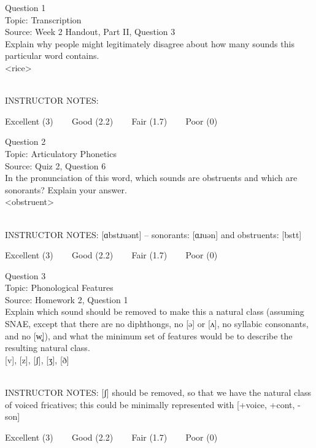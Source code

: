 \documentclass[12pt]{article}
\begin{document}
{\large Question 1}\\

Topic: Transcription\\
Source: Week 2 Handout, Part II, Question 3\\

Explain why people might legitimately disagree about how many sounds this particular word contains.\\

<rice>


~\\
INSTRUCTOR NOTES: 


\vfill
Excellent (3) ~~~ Good (2.2) ~~~ Fair (1.7) ~~~ Poor (0)
\newpage

{\large Question 2}\\

Topic: Articulatory Phonetics\\
Source: Quiz 2, Question 6\\

In the pronunciation of this word, which sounds are obstruents and which are sonorants? Explain your answer.\\

<obstruent>


~\\
INSTRUCTOR NOTES: [ɑbstɹuənt] -- sonorants: [ɑɹuən] and obstruents: [bstt]


\vfill
Excellent (3) ~~~ Good (2.2) ~~~ Fair (1.7) ~~~ Poor (0)
\newpage

{\large Question 3}\\

Topic: Phonological Features\\
Source: Homework 2, Question 1\\

Explain which sound should be removed to make this a natural class (assuming SNAE, except that there are no diphthongs, no [ə] or [ʌ], no syllabic consonants, and no [w̥]), and what the minimum set of features would be to describe the resulting natural class.\\

{[v]}, {[z]}, {[ʃ]}, {[ʒ]}, {[ð]}


~\\
INSTRUCTOR NOTES: [ʃ] should be removed, so that we have the natural class of voiced fricatives; this could be minimally represented with [+voice, +cont, -son]


\vfill
Excellent (3) ~~~ Good (2.2) ~~~ Fair (1.7) ~~~ Poor (0)
\newpage
\end{document}
